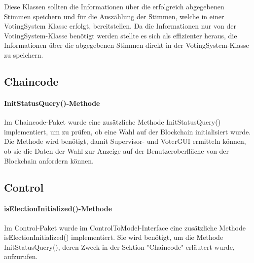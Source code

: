 \documentclass[parskip=full]{scrartcl}
\begin{document}
Diese Klassen sollten die Informationen über die erfolgreich abgegebenen Stimmen speichern und für die Auszählung der Stimmen, welche in einer VotingSystem Klasse erfolgt, bereitstellen.
Da die Informationen nur von der VotingSystem-Klasse benötigt werden
stellte es sich als effizienter heraus, die Informationen über die abgegebenen Stimmen direkt in der VotingSystem-Klasse zu speichern.

\subsection{Chaincode}
\paragraph{InitStatusQuery()-Methode}
Im Chaincode-Paket wurde eine zusätzliche Methode InitStatusQuery() implementiert, um zu prüfen, ob eine Wahl auf der Blockchain initialisiert wurde. Die Methode wird benötigt, damit Supervisor- und VoterGUI ermitteln können, ob sie die Daten der Wahl zur Anzeige auf der Benutzeroberfläche von der Blockchain anfordern können.

\subsection{Control}
\paragraph{isElectionInitialized()-Methode}
Im Control-Paket wurde im ControlToModel-Interface eine zusätzliche Methode
isElectionInitialized() implementiert. Sie wird benötigt, um die Methode InitStatusQuery(), deren Zweck in der Sektion "Chaincode" erläutert wurde, aufzurufen.
\end{document}
